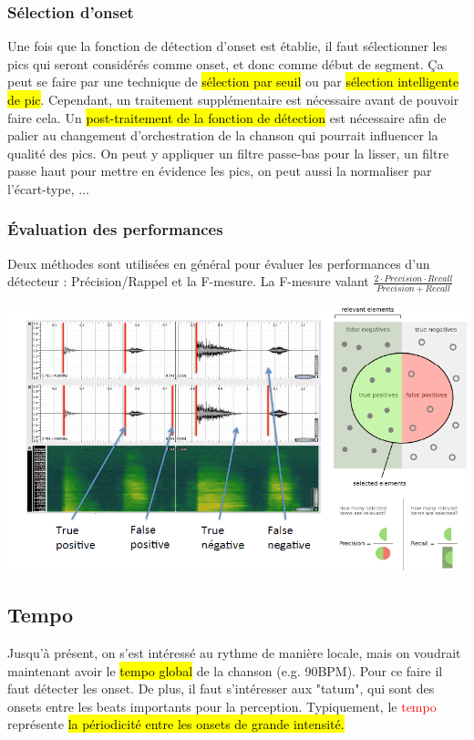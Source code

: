 \documentclass[letterpaper, 12pt]{article}
\newcommand{\alinea}{
\hspace*{0.5cm}}
\newcommand{\red}[1]{
	\textcolor{red}{#1}}
\begin{document}
			\subsubsection{Sélection d'onset}
				\alinea Une fois que la fonction de détection d'onset est établie, il faut sélectionner les pics qui seront considérés comme
					onset, et donc comme début de segment. Ça peut se faire par une technique de \hl{sélection par seuil} ou par \hl{sélection
					intelligente de pic}. Cependant, un traitement supplémentaire est nécessaire avant de pouvoir faire cela. Un 
					\hl{post-traitement de la fonction de détection} est nécessaire afin de palier au changement d'orchestration de la chanson
					qui pourrait influencer la qualité des pics. On peut y appliquer un filtre passe-bas pour la lisser, un filtre passe haut 
					pour mettre en évidence les pics, on peut aussi la normaliser par l'écart-type, ...
			\subsubsection{\'Evaluation des performances}
				\alinea Deux méthodes sont utilisées en général pour évaluer les performances d'un détecteur : Précision/Rappel et la 
					F-mesure. La F-mesure valant $\frac{2 \cdot Precision \cdot Recall}{Precision + Recall}$
				\begin{center}
					\includegraphics[width=\textwidth]{Images/precision}
				\end{center}
		\subsection{Tempo}
			\alinea Jusqu'à présent, on s'est intéressé au rythme de manière locale, mais on voudrait maintenant avoir le \hl{tempo global} 
				de la chanson (e.g. 90BPM). Pour ce faire il faut détecter les onset. De plus, il faut s'intéresser aux "tatum", qui sont 
				des onsets entre les beats importants pour la perception. Typiquement, le \red{tempo} représente \hl{la périodicité entre 
				les onsets de grande intensité.}
\end{document}
